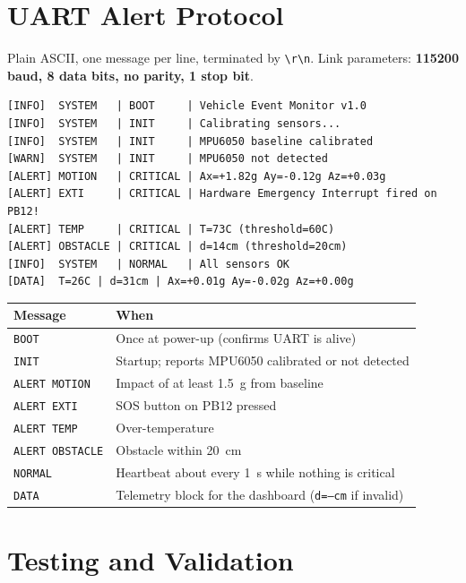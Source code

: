 \documentclass[11pt,a4paper]{article}
\begin{document}
\section{UART Alert Protocol}
Plain ASCII, one message per line, terminated by \texttt{\textbackslash r\textbackslash n}. Link parameters: \textbf{115200 baud, 8 data bits, no parity, 1 stop bit}.

\begin{lstlisting}
[INFO]  SYSTEM   | BOOT     | Vehicle Event Monitor v1.0
[INFO]  SYSTEM   | INIT     | Calibrating sensors...
[INFO]  SYSTEM   | INIT     | MPU6050 baseline calibrated
[WARN]  SYSTEM   | INIT     | MPU6050 not detected
[ALERT] MOTION   | CRITICAL | Ax=+1.82g Ay=-0.12g Az=+0.03g
[ALERT] EXTI     | CRITICAL | Hardware Emergency Interrupt fired on PB12!
[ALERT] TEMP     | CRITICAL | T=73C (threshold=60C)
[ALERT] OBSTACLE | CRITICAL | d=14cm (threshold=20cm)
[INFO]  SYSTEM   | NORMAL   | All sensors OK
[DATA]  T=26C | d=31cm | Ax=+0.01g Ay=-0.02g Az=+0.00g
\end{lstlisting}

\begin{tabularx}{\textwidth}{@{}L{3.8cm} X@{}}
\toprule
\textbf{Message} & \textbf{When}\\
\midrule
\texttt{BOOT} & Once at power-up (confirms UART is alive)\\
\texttt{INIT} & Startup; reports MPU6050 calibrated or not detected\\
\texttt{ALERT MOTION} & Impact of at least 1.5~g from baseline\\
\texttt{ALERT EXTI} & SOS button on PB12 pressed\\
\texttt{ALERT TEMP} & Over-temperature\\
\texttt{ALERT OBSTACLE} & Obstacle within 20~cm\\
\texttt{NORMAL} & Heartbeat about every 1~s while nothing is critical\\
\texttt{DATA} & Telemetry block for the dashboard (\texttt{d=--cm} if invalid)\\
\bottomrule
\end{tabularx}

\section{Testing and Validation}
\end{document}

